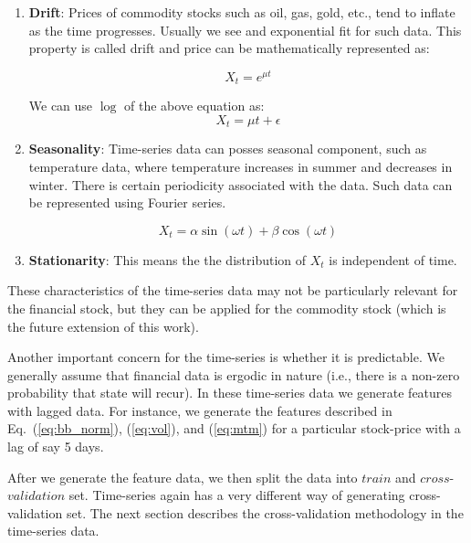 \documentclass[12pt]{article}
\begin{document}
\begin{itemize}
\begin{enumerate}
\item \textbf{Drift}: Prices of commodity stocks such as oil, gas, gold, etc., tend to inflate as the time progresses. Usually we see and exponential fit for such data. This property is called drift and price can be mathematically represented as:

\begin{equation}
\label{eqn:drift}
X_t=e^{\mu t}
\end{equation}

We can use  $\log$ of the above equation as:
\begin{equation}
\label{eqn:drift2}
X_t=\mu  t+\epsilon
\end{equation}

\item \textbf{Seasonality}: Time-series data can posses seasonal component, such as temperature data, where temperature increases in summer and decreases in winter. There is certain periodicity associated with the data. Such data can be represented using Fourier series.

\begin{equation}
\label{eqn:season}
X_t=\alpha\sin(\omega t) + \beta\cos(\omega t)
\end{equation}

\item \textbf{Stationarity}: This means the the distribution of $X_t$ is independent of time.

\end{enumerate}

These characteristics of the time-series data may not be particularly relevant for the financial stock, but they can be applied for the commodity stock (which is the future extension of this work).

Another important concern for the time-series is whether it is predictable. We generally assume that financial data is ergodic in nature (i.e., there is a non-zero probability that state will recur). In these time-series data we generate features with lagged data. For instance, we generate the features described in Eq.~(\ref{eq:bb_norm}), (\ref{eq:vol}), and (\ref{eq:mtm}) for a particular stock-price  with a lag of say 5 days. 

After we generate the feature data, we then split the data into $train$ and $cross$-$validation$ set. Time-series again has a very different way of generating cross-validation set.  The next section describes the cross-validation methodology in the time-series data.


\end{itemize}
\end{document}
